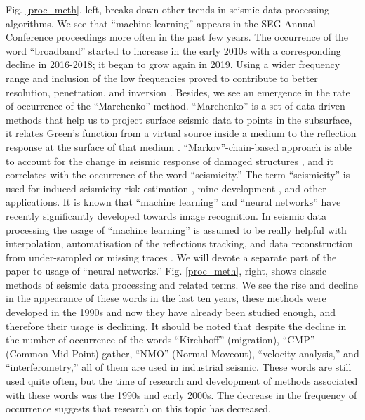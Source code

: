 \documentclass[geosciences,article,submit,moreauthors,pdftex]{Definitions/mdpi}
\begin{document}
Fig. \ref{proc_meth}, left, breaks down other trends in seismic data processing algorithms. We see that ``machine learning'' appears in the SEG Annual Conference proceedings more often in the past few years. The occurrence of the word ``broadband'' started to increase in the early 2010s with a corresponding decline in 2016-2018; it began to grow again in 2019. Using a wider frequency range and inclusion of the low frequencies proved to contribute to better resolution, penetration, and inversion \citep{Kroode2013}. Besides, we see an emergence in the rate of occurrence of the ``Marchenko'' method. ``Marchenko'' is a set of data-driven methods that help us to project surface seismic data to points in the subsurface, it relates Green’s function from a virtual source inside a medium to the reflection response at the surface of that medium \citep{Lomas2019, Thorbecke2017}. ``Markov''-chain-based approach is able to account for the change in seismic response of damaged structures \citep{Iervolino2016}, and it correlates with the occurrence of the word ``seismicity.'' The term ``seismicity'' is used for induced seismicity risk estimation \citep{Weir2018}, mine development \citep{Barthwal2018}, and other applications. It is known that ``machine learning'' and ``neural networks'' have recently significantly developed towards image recognition. In seismic data processing the usage of ``machine learning'' is assumed to be really helpful with interpolation, automatisation of the reflections tracking, and data reconstruction from under-sampled or missing traces \citep{Jia2017}. We will devote a separate part of the paper to usage of ``neural networks.'' Fig. \ref{proc_meth}, right, shows classic methods of seismic data processing and related terms. We see the rise and decline in the appearance of these words in the last ten years, these methods were developed in the 1990s and now they have already been studied enough, and therefore their usage is declining. It should be noted that despite the decline in the number of occurrence of the words ``Kirchhoff'' (migration), ``CMP'' (Common Mid Point) gather, ``NMO'' (Normal Moveout), ``velocity analysis,'' and ``interferometry,'' all of them are used in industrial seismic. These words are still used quite often, but the time of research and development of methods associated with these words was the 1990s and early 2000s. The decrease in the frequency of occurrence suggests that research on this topic has decreased.
\end{document}
